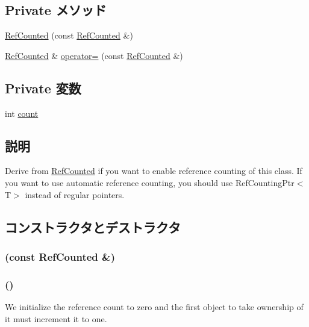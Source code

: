 \subsection*{Private メソッド}
\begin{DoxyCompactItemize}
\item 
\hyperlink{classRefCounted_af66f84bd2408304143da35229d0a7d3e}{RefCounted} (const \hyperlink{classRefCounted}{RefCounted} \&)
\item 
\hyperlink{classRefCounted}{RefCounted} \& \hyperlink{classRefCounted_a6d93b6225e8065317a03fd3eff362552}{operator=} (const \hyperlink{classRefCounted}{RefCounted} \&)
\end{DoxyCompactItemize}
\subsection*{Private 変数}
\begin{DoxyCompactItemize}
\item 
int \hyperlink{classRefCounted_ad43c3812e6d13e0518d9f8b8f463ffcf}{count}
\end{DoxyCompactItemize}


\subsection{説明}
Derive from \hyperlink{classRefCounted}{RefCounted} if you want to enable reference counting of this class. If you want to use automatic reference counting, you should use RefCountingPtr$<$T$>$ instead of regular pointers. 

\subsection{コンストラクタとデストラクタ}
\hypertarget{classRefCounted_af66f84bd2408304143da35229d0a7d3e}{
\subsubsection[{RefCounted}]{ (const {\bf RefCounted} \&)}}
\label{classRefCounted_af66f84bd2408304143da35229d0a7d3e}
\hypertarget{classRefCounted_aebb1990f519367c00c1861b5b3b3e0a5}{
\subsubsection[{RefCounted}]{ ()}}
\label{classRefCounted_aebb1990f519367c00c1861b5b3b3e0a5}
We initialize the reference count to zero and the first object to take ownership of it must increment it to one.

